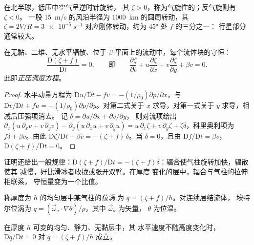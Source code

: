 在北半球，低压中空气呈逆时针旋转，
其 $\zeta > 0$，称为气旋性的；反气旋则有 $\zeta < 0$。
一股 \qty{15}{m/s} 的风沿半径为 \qty{1000}{km} 的圆周转动，其 $\zeta =
2V/R = \qty{3e-5}{s^{-1}}$ 对应刚体转动，约为 \ang{45} 处 $f$ 的三分之一：
行星部分通常较大。

\begin{theorem}[正压涡度方程]\label{thm:b3:atmospheric-dynamics:bve}
在无黏、二维、无水平辐散、位于
$\beta$ 平面上的流动中，每个流体块的守恒：
\[
\frac{\mathrm D(\zeta + f)}{\mathrm Dt} = 0 ,
\qquad\text{即}\qquad
\frac{\partial\zeta}{\partial t} + u\frac{\partial\zeta}{\partial x} + v\frac{\partial\zeta}{\partial y} + \beta v = 0 .
\]
此即\emph{正压涡度方程}。
\end{theorem}

\begin{proof}
水平动量方程为 $\mathrm Du/\mathrm Dt - fv =
-(1/\rho_0)\partial p/\partial x$，与 $\mathrm Dv/\mathrm Dt + fu =
-(1/\rho_0)\partial p/\partial y$。对第二式关于
$x$ 求导，对第一式关于 $y$ 求导，相减后压强项消去。
记 $\delta = \partial u/\partial x + \partial v/\partial y$，
则对流项给出 $\partial_x(u\,\partial_xv + v\,\partial_yv) -
\partial_y(u\,\partial_xu + v\,\partial_yu) = u\,\partial_x\zeta +
v\,\partial_y\zeta + \zeta\delta$，科里奥利项为 $f\delta + \beta
v$。由此 $\mathrm D\zeta/\mathrm Dt + \beta v = -(\zeta + f)\,\delta$。当
$\delta = 0$，且由 $\mathrm Df/\mathrm Dt = \beta v$，$\mathrm D(\zeta +
f)/\mathrm Dt = 0$。
\end{proof}

证明还给出一般规律：$\mathrm D(\zeta + f)/\mathrm Dt =
-(\zeta + f)\delta$：辐合使气柱旋转加快，辐散使其
减慢，好比滑冰者收拢或张开双臂。在厚度
变化的层中，辐合与气柱的拉伸相联系，
守恒量变为一个比值。

\begin{definition}[位涡]\label{def:b3:atmospheric-dynamics:pv}
称厚度为 $h$ 的均匀层中某气柱的\emph{位涡}
为 $q = (\zeta + f)/h$。对连续层结流体，
埃特尔位涡为 $q = (\vec\omega_a\cdot
\nabla\theta)/\rho$，其中 $\vec\omega_a$ 为矢量，
$\theta$ 为位温。
\end{definition}

\begin{theorem}[位涡守恒]\label{thm:b3:atmospheric-dynamics:pv}
在厚度 $h$ 可变的均匀、静力、无黏层中，其
水平速度不随高度变化时，$\mathrm Dq/\mathrm Dt = 0$
对 $q = (\zeta + f)/h$ 成立。
\end{theorem}

